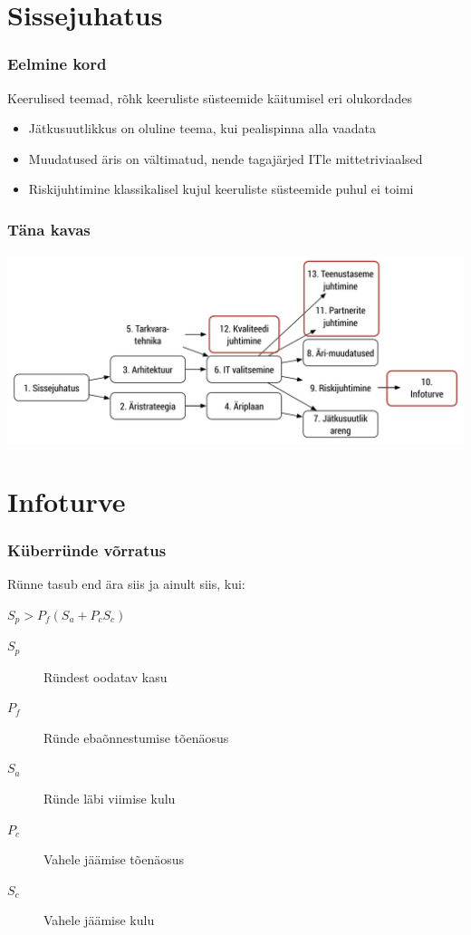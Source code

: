 

\maketitle

\section{Sissejuhatus}
\begin{frame}[fragile]
  \frametitle{Eelmine kord}
  Keerulised teemad, rõhk keeruliste süsteemide käitumisel eri olukordades
	\begin{itemize}
		\item Jätkusuutlikkus on oluline teema, kui pealispinna alla vaadata
		\item Muudatused äris on vältimatud, nende tagajärjed ITle mittetriviaalsed
		\item Riskijuhtimine klassikalisel kujul keeruliste süsteemide puhul ei toimi
	\end{itemize}
\end{frame}

\begin{frame}[fragile]
  \frametitle{Täna kavas}
		\includegraphics[width=\textwidth]{aine_struktuur_neljas.pdf}
\end{frame}

\section{Infoturve}
\begin{frame}[fragile]
  \frametitle{Küberründe võrratus}
	\begin{center}
	  Rünne tasub end ära siis ja ainult siis, kui:\par
		$S_p>P_f(S_a + P_c S_c)$
	\vfill
	\begin{description}
		\item[$S_p$] Ründest oodatav kasu
		\item[$P_f$] Ründe ebaõnnestumise tõenäosus
		\item[$S_a$] Ründe läbi viimise kulu
		\item[$P_c$] Vahele jäämise tõenäosus
		\item[$S_c$] Vahele jäämise kulu
	\end{description}
	\end{center}

\end{frame}

